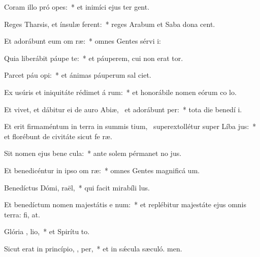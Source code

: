 \item Coram illo pró opes:~* et inimíci ejus ter gent.
\item Reges Tharsis, et ínsulæ  ferent:~* reges Arabum et Saba dona cent.
\item Et adorábunt eum om  ræ:~* omnes Gentes sérvi i:
\item Quia liberábit páupe  te:~* et páuperem, cui non erat tor.
\item Parcet páu  opi:~* et ánimas páuperum sal ciet.
\item Ex usúris et iniquitáte rédimet á rum:~* et honorábile nomen eórum co lo.
\item Et vivet, et dábitur ei de auro Abiæ,~\pscross{} et adorábunt   per:~* tota die benedí i.
\item Et erit firmaméntum in terra in summis tium,~\pscross{} superextollétur super Líba  jus:~* et florébunt de civitáte sicut fe ræ.
\item Sit nomen ejus bene  cula:~* ante solem pérmanet no jus.
\item Et benedicéntur in ipso om  ræ:~* omnes Gentes magnificá um.
\item Benedíctus Dómi,  raël,~* qui facit mirabíli lus.
\item Et benedíctum nomen majestátis e  num:~* et replébitur majestáte ejus omnis terra: fi, at.
\item Glória ,  lio,~* et Spirítu to.
\item Sicut erat in princípio,  ,  per,~* et in sǽcula sæculó. men.
